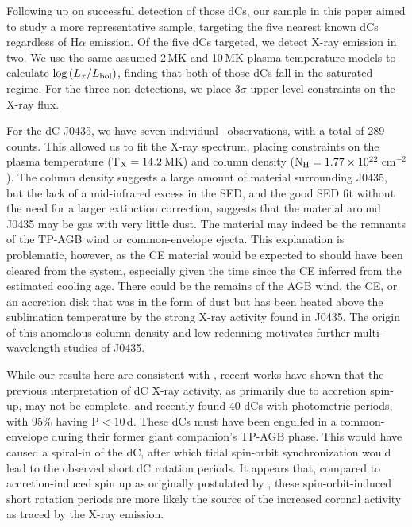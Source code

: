 \documentclass[twocolumn, tighten, times, astrosymb]{aastex631}
\begin{document}
Following up on successful detection of those dCs, our sample in this paper aimed to study a more representative sample, targeting the five nearest known dCs regardless of H$\alpha$ emission. Of the five dCs targeted, we detect X-ray emission in two. We use the same assumed 2\,MK and 10\,MK plasma temperature models to calculate $\log{(\LxLbol)}$, finding that both of those dCs fall in the saturated regime. For the three non-detections, we place $3\sigma$ upper level constraints on the X-ray flux.

For the dC J0435, we have seven individual \Chandra\ observations, with a total of 289 counts. This allowed us to fit the X-ray spectrum, placing constraints on the plasma temperature (T$_{\rm X} = 14.2$\,MK) and column density (N$_{\rm H} = 1.77\times10^{22}$\,cm$^{-2}$). The column density suggests a large amount of material surrounding J0435, but the lack of a mid-infrared excess in the SED, and the good SED fit without the need for a larger extinction correction, suggests that the material around J0435 may be gas with very little dust. The material may indeed be the remnants of the TP-AGB wind or common-envelope ejecta. This explanation is problematic, however, as the CE material would be expected to should have been cleared from the system, especially given the time since the CE inferred from the estimated cooling age. There could be the remains of the AGB wind, the CE, or an accretion disk that was in the form of dust but has been heated above the sublimation temperature by the strong X-ray activity found in J0435. The origin of this anomalous column density and low redenning motivates further multi-wavelength studies of J0435. 

While our results here are consistent with \citet{Green2019}, recent works have shown that the previous interpretation of dC X-ray activity, as primarily due to accretion spin-up,  may not be complete. \citet{Roulston2021a} and \cite{Whitehouse2021} recently found 40 dCs with photometric periods, with 95\% having P$<10$\,d. These dCs must have been engulfed in a common-envelope during their former giant companion's TP-AGB phase. This would have caused a spiral-in of the dC, after which tidal spin-orbit synchronization would lead to the observed short dC rotation periods. It appears that, compared to accretion-induced spin up as originally postulated by  \citet{Green2019}, these spin-orbit-induced short rotation periods are more likely the source of the increased coronal activity as traced by the X-ray emission. 
\end{document}
